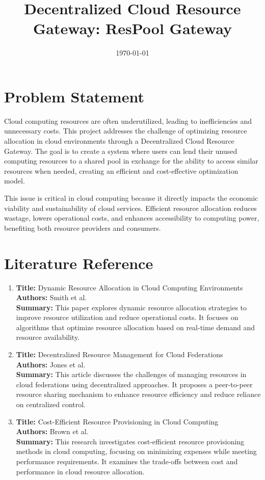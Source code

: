 \documentclass{article}
\title{Decentralized Cloud Resource Gateway: ResPool Gateway}
\author{}
\date{\today}
\begin{document}
\maketitle

\section{Problem Statement}

Cloud computing resources are often underutilized, leading to inefficiencies and unnecessary costs. This project addresses the challenge of optimizing resource allocation in cloud environments through a Decentralized Cloud Resource Gateway. The goal is to create a system where users can lend their unused computing resources to a shared pool in exchange for the ability to access similar resources when needed, creating an efficient and cost-effective optimization model.

This issue is critical in cloud computing because it directly impacts the economic viability and sustainability of cloud services. Efficient resource allocation reduces wastage, lowers operational costs, and enhances accessibility to computing power, benefiting both resource providers and consumers.

\section{Literature Reference}

\begin{enumerate}
    \item \textbf{Title:} Dynamic Resource Allocation in Cloud Computing Environments\\
    \textbf{Authors:} Smith et al.\\
    \textbf{Summary:} This paper explores dynamic resource allocation strategies to improve resource utilization and reduce operational costs. It focuses on algorithms that optimize resource allocation based on real-time demand and resource availability.
    \item \textbf{Title:} Decentralized Resource Management for Cloud Federations\\
    \textbf{Authors:} Jones et al.\\
    \textbf{Summary:} This article discusses the challenges of managing resources in cloud federations using decentralized approaches. It proposes a peer-to-peer resource sharing mechanism to enhance resource efficiency and reduce reliance on centralized control.
    \item \textbf{Title:} Cost-Efficient Resource Provisioning in Cloud Computing\\
    \textbf{Authors:} Brown et al.\\
    \textbf{Summary:} This research investigates cost-efficient resource provisioning methods in cloud computing, focusing on minimizing expenses while meeting performance requirements. It examines the trade-offs between cost and performance in cloud resource allocation.
\end{enumerate}
\end{document}
